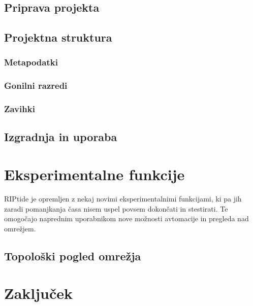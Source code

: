 \documentclass[12pt]{article}
\begin{document}
\subsection{Priprava projekta}
\subsection{Projektna struktura} \label{projektna-struktura}
\subsubsection{Metapodatki}
\subsubsection{Gonilni razredi}
\subsubsection{Zavihki}
\subsection{Izgradnja in uporaba}
\newpage

\section{Eksperimentalne funkcije}
RIPtide je opremljen z nekaj novimi eksperimentalnimi funkcijami,
ki pa jih zaradi pomanjkanja časa nisem uspel povsem dokončati in
stestirati. Te omogočajo naprednim uporabnikom nove možnosti avtomacije
in pregleda nad omrežjem.

\subsection{Topološki pogled omrežja}
\newpage

\section{Zaključek}
\newpage
\end{document}
